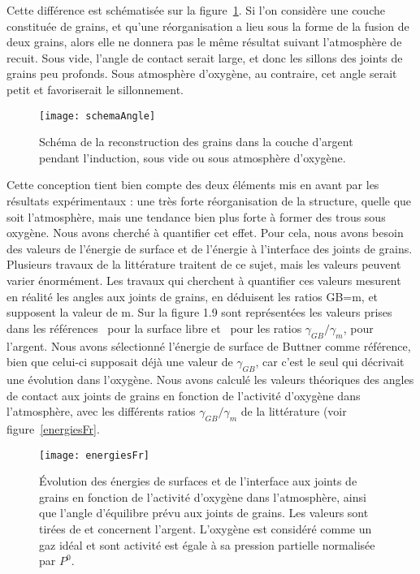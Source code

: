{Cette différence est schématisée sur la figure~\ref{schemaAngle}. Si l’on considère une couche constituée de grains, et qu’une réorganisation a lieu sous la forme de la fusion de deux grains, alors elle ne donnera pas le même résultat suivant l’atmosphère de recuit. Sous vide, l’angle de contact serait large, et donc les sillons des joints de grains peu profonds. Sous atmosphère d’oxygène, au contraire, cet angle serait petit et favoriserait le sillonnement.\par 
\begin{figure}[!htb]
\centering
\texttt{[image: schemaAngle]}
\caption{Schéma de la reconstruction des grains dans la couche d’argent pendant l’induction, sous vide ou sous atmosphère d’oxygène.}
\label{schemaAngle}
\end{figure}
Cette conception tient bien compte des deux éléments mis en avant par les résultats expérimentaux : une très forte réorganisation de la structure, quelle que soit l’atmosphère, mais une tendance bien plus forte à former des trous sous oxygène. Nous avons cherché à quantifier cet effet. Pour cela, nous avons besoin des valeurs de l’énergie de surface et de l’énergie à l’interface des joints de grains. Plusieurs travaux de la littérature traitent de ce sujet, mais les valeurs peuvent varier énormément. Les travaux qui cherchent à quantifier ces valeurs mesurent en réalité les angles aux joints de grains, en déduisent les ratios  GB=m, et supposent la valeur de m. Sur la figure 1.9 sont représentées les valeurs prises dans les références~\cite{buttner1952adsorption} pour la surface libre et~\cite{inman1963interfacial, fiala1975surface, kudrman1969relative} pour les ratios  $\gamma_{GB}/\gamma_m$, pour l’argent. Nous avons sélectionné l’énergie de surface de Buttner comme référence, bien que celui-ci supposait déjà une valeur de $\gamma_{GB}$, car c’est le seul qui décrivait une évolution dans l’oxygène. Nous avons calculé les valeurs théoriques des angles de contact aux joints de grains en fonction de l’activité d’oxygène dans l’atmosphère, avec les différents ratios $\gamma_{GB}/\gamma_m$ de la littérature (voir figure~\ref{energiesFr}.\par 
\begin{figure}[!htb]
\centering
\texttt{[image: energiesFr]}
\caption{Évolution des énergies de surfaces et de l’interface aux joints de grains en fonction de l’activité d’oxygène dans l’atmosphère, ainsi que l’angle d’équilibre prévu aux joints de grains. Les valeurs sont tirées de \cite{buttner1952adsorption, inman1963interfacial, fiala1975surface, kudrman1969relative} et concernent l’argent. L'oxygène est considéré comme un gaz idéal et sont activité est égale à sa pression partielle normalisée par $P^0$.}

\end{figure}}
